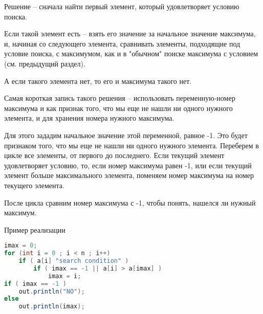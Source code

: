 \documentclass[a4paper]{article}
\begin{document}
Решение -- сначала найти первый элемент, который удовлетворяет условию поиска.

Если такой элемент есть -- взять его значение за начальное значение максимума, и, начиная со следующего элемента, сравнивать элементы, подходящие под условие поиска, с максимумом, как и в "обычном" поиске максимума с условием (см. предыдущий раздел).

А если такого элемента нет, то его и максимума такого нет.

Самая короткая запись такого решения -- использовать переменную-номер максимума и как признак того, что мы еще не нашли ни одного нужного элемента, и для хранения номера нужного максимума.

Для этого зададим начальное значение этой переменной, равное -1.
Это будет признаком того, что мы еще не нашли ни одного нужного элемента.
Переберем в цикле все элементы, от первого до последнего.
Если текущий элемент удовлетворяет условию, то, если номер максимума равен -1, или если текущий элемент больше максимального элемента, поменяем номер максимума на номер текущего элемента.

После цикла сравним номер максимума с -1, чтобы понять, нашелся ли нужный максимум.

Пример реализации
\begin{lstlisting}[language=Java] 
imax = 0;
for (int i = 0 ; i < n ; i++)
    if ( a[i] "search condition" )
        if ( imax == -1 || a[i] > a[imax] )
            imax = i;
if ( imax == -1 )
    out.println("NO");
else
    out.println(imax);
\end{lstlisting} 
\end{document}

